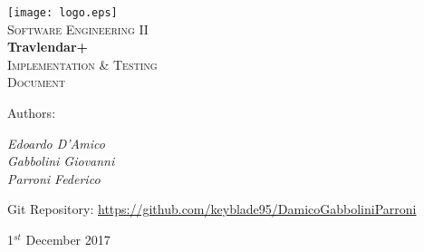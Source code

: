 \documentclass [11pt,a4paper,oneside,openany]{book} %
\begin{document}

\begin{titlepage}

 \begin{center} 
     \texttt{[image: logo.eps]}\\
     \vspace{4em}
     {\Large \textsc{Software Engineering II}}\\
     \vspace{6em}
     {\LARGE \textbf{Travlendar+}}\\
     \vspace{3em}
     {\Large \textsc{Implementation \& Testing}}\\
     \vspace{1em}
     {\Large \textsc{Document}}\\
 \end{center}
 
    \vskip 1cm
 
 	Authors:
 	\vspace{0.5em}
 	\begin{center}
      {\Large \textit{Edoardo D'Amico}}\\
      {\Large \textit{Gabbolini Giovanni}}\\
      {\Large \textit{Parroni Federico}}\\
    \end{center}

	\vskip 1.5cm    
    
    \begin{center}
    Git Repository: \url{https://github.com/keyblade95/DamicoGabboliniParroni}
	\end{center}

\vskip 2cm
\begin{center}
{\normalsize 1$^{st}$ December 2017}
\end{center}

\end{titlepage}

\newpage

\pagestyle{fancy}
\renewcommand{\chaptername}{Chapter}
\renewcommand{\chaptermark} [1]{\chaptername\ \thechapter.\ #1}{} 
\renewcommand{\chaptermark}[1]{\markboth{\thechapter.\ #1}{}} 
\renewcommand{\sectionmark}[1]{\markright{\thesection\ #1}}
\fancyhf{}
\fancyhead[LE,RO]{\bfseries\thepage} 
\fancyhead[LO,RE]{\bfseries\leftmark}

\renewcommand{\contentsname}{Indice}
\renewcommand{\listfigurename}{Elenco delle Figure}
\renewcommand{\listtablename}{Elenco delle Tabelle}
\tableofcontents

\linespread{1.5}\selectfont		%






\appendix
\end{document}
